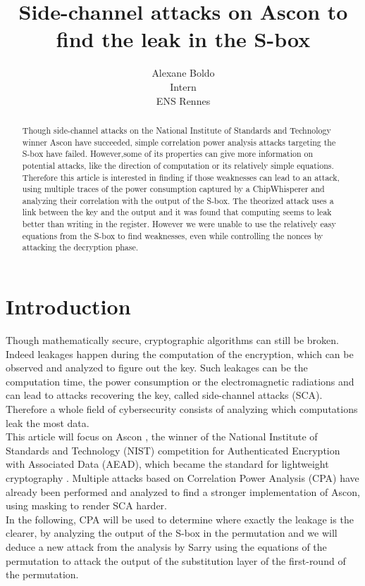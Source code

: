 \documentclass[a4paper,11pt,twocolumn]{article}
\author{
	Alexane Boldo\\
	Intern\\
	ENS Rennes
}
\title{Side-channel attacks on Ascon to find the leak in the S-box}
\date{}
\begin{document}
	\maketitle
	
	\begin{abstract}
		Though side-channel attacks on the National Institute of Standards and Technology winner Ascon have succeeded, simple correlation power analysis attacks targeting the S-box have failed. However,some of its properties can give more information on potential attacks, like the direction of computation or its relatively simple equations. Therefore this article is interested in finding if those weaknesses can lead to an attack, using multiple traces of the power consumption captured by a ChipWhisperer and analyzing their correlation with the output of the S-box. The theorized attack uses a link between the key and the output and it was found that computing seems to leak better than writing in the register. However we were unable to use the relatively easy equations from the S-box to find weaknesses, even while controlling the nonces by attacking the decryption phase.
	\end{abstract}
	
	
	\section{Introduction}
	Though mathematically secure, cryptographic algorithms can still be broken. Indeed leakages happen during the computation of the encryption, which can be observed and analyzed to figure out the key. Such leakages can be the computation time, the power consumption or the electromagnetic radiations and can lead to attacks recovering the key, called side-channel attacks (SCA). Therefore a whole field of cybersecurity consists of analyzing which computations leak the most data.\\
	This article will focus on Ascon \cite{ascon}, the winner of the National Institute of Standards and Technology (NIST) competition for Authenticated Encryption with Associated Data (AEAD), which became the standard for lightweight cryptography \cite{norme}. Multiple attacks \cite{cpa_lin,dl_cpa} based on Correlation Power Analysis (CPA) have already been performed and analyzed \cite{cpa_analysis} to find a stronger implementation of Ascon, using masking to render SCA harder.\\
	In the following, CPA will be used to determine where exactly the leakage is the clearer, by analyzing the output of the S-box in the permutation and we will deduce a new attack from the analysis by Sarry \cite{these} using the equations of the permutation to attack the output of the substitution layer of the first-round of the permutation.
	
\end{document}
